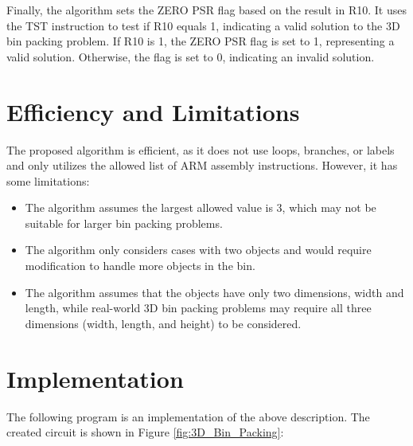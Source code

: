 Finally, the algorithm sets the ZERO PSR flag based on the result in R10. It uses the TST instruction to test if R10 equals 1, indicating a valid solution to the 3D bin packing problem. If R10 is 1, the ZERO PSR flag is set to 1, representing a valid solution. Otherwise, the flag is set to 0, indicating an invalid solution.

\section{Efficiency and Limitations}

The proposed algorithm is efficient, as it does not use loops, branches, or labels and only utilizes the allowed list of ARM assembly instructions. However, it has some limitations:

\begin{itemize}
\item The algorithm assumes the largest allowed value is 3, which may not be suitable for larger bin packing problems.
\item The algorithm only considers cases with two objects and would require modification to handle more objects in the bin.
\item The algorithm assumes that the objects have only two dimensions, width and length, while real-world 3D bin packing problems may require all three dimensions (width, length, and height) to be considered.
\end{itemize}



\section{Implementation}

The following program is an implementation of the above description. The created circuit is shown in Figure \ref{fig:3D_Bin_Packing}:

